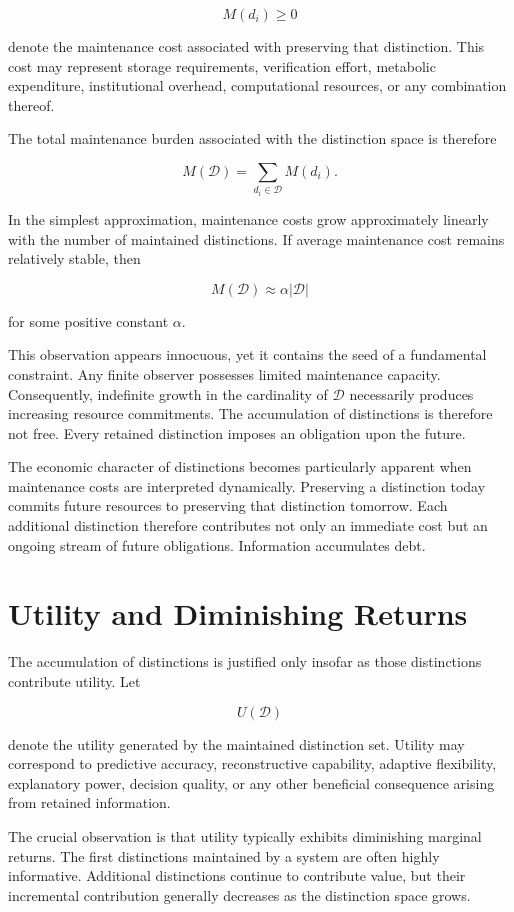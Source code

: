 \documentclass[12pt,oneside]{book}
\theoremstyle{plain} \newtheorem{theorem}{Theorem}[chapter] \newtheorem{lemma}[theorem]{Lemma} \newtheorem{proposition}[theorem]{Proposition} \newtheorem{corollary}[theorem]{Corollary}
\theoremstyle{definition} \newtheorem{definition}[theorem]{Definition} \newtheorem{axiom}[theorem]{Axiom} \newtheorem{construction}[theorem]{Construction}
\theoremstyle{remark} \newtheorem{remark}[theorem]{Remark} \newtheorem{example}[theorem]{Example}
\newcommand{\D}{\mathcal{D}} \newcommand{\R}{\mathcal{R}} \newcommand{\F}{\mathcal{F}} \newcommand{\U}{\mathcal{U}} \newcommand{\M}{\mathcal{M}} \newcommand{\G}{\Gamma}
\begin{document}
\[
M(d_i)\geq 0
\]

denote the maintenance cost associated with preserving that distinction. This cost may represent storage requirements, verification effort, metabolic expenditure, institutional overhead, computational resources, or any combination thereof.

The total maintenance burden associated with the distinction space is therefore

\[
M(\D)
=
\sum_{d_i\in \D}
M(d_i).
\]

In the simplest approximation, maintenance costs grow approximately linearly with the number of maintained distinctions. If average maintenance cost remains relatively stable, then

\[
M(\D)
\approx
\alpha |\D|
\]

for some positive constant $\alpha$.

This observation appears innocuous, yet it contains the seed of a fundamental constraint. Any finite observer possesses limited maintenance capacity. Consequently, indefinite growth in the cardinality of $\D$ necessarily produces increasing resource commitments. The accumulation of distinctions is therefore not free. Every retained distinction imposes an obligation upon the future.

The economic character of distinctions becomes particularly apparent when maintenance costs are interpreted dynamically. Preserving a distinction today commits future resources to preserving that distinction tomorrow. Each additional distinction therefore contributes not only an immediate cost but an ongoing stream of future obligations. Information accumulates debt.

\section{Utility and Diminishing Returns}

The accumulation of distinctions is justified only insofar as those distinctions contribute utility. Let

\[
U(\D)
\]

denote the utility generated by the maintained distinction set. Utility may correspond to predictive accuracy, reconstructive capability, adaptive flexibility, explanatory power, decision quality, or any other beneficial consequence arising from retained information.

The crucial observation is that utility typically exhibits diminishing marginal returns. The first distinctions maintained by a system are often highly informative. Additional distinctions continue to contribute value, but their incremental contribution generally decreases as the distinction space grows.
\end{document}
